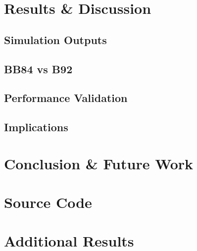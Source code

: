 \documentclass[10pt, a4paper]{report}
\renewcommand{\footnotesize}{\fontsize{8}{9}\selectfont}
\begin{document}



\chapter{Results \& Discussion}


\section{Simulation Outputs}

\section{BB84 vs B92}

\section{Performance Validation}

\section{Implications}

\chapter{Conclusion \& Future Work}





\clearpage
{\footnotesize


}

\appendix

\chapter{Source Code}

\chapter{Additional Results}
\end{document}
